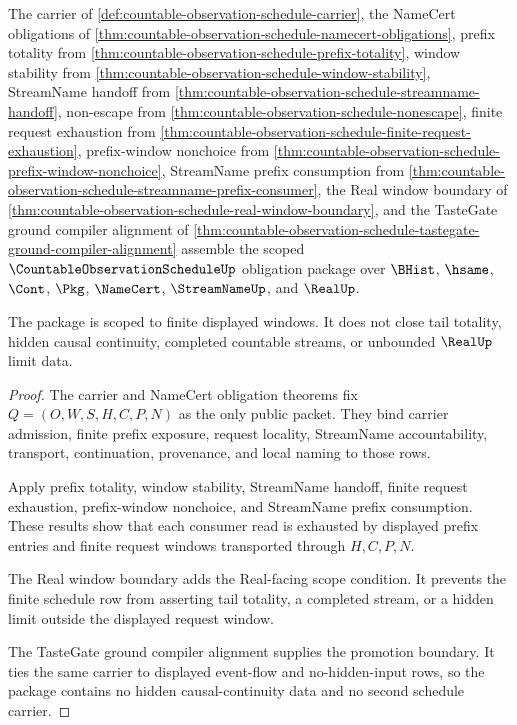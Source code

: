 \begin{theorem}
\label{thm:countable-observation-schedule-scoped-obligation-package}
The carrier of \autoref{def:countable-observation-schedule-carrier}, the NameCert obligations of \autoref{thm:countable-observation-schedule-namecert-obligations}, prefix totality from \autoref{thm:countable-observation-schedule-prefix-totality}, window stability from \autoref{thm:countable-observation-schedule-window-stability}, StreamName handoff from \autoref{thm:countable-observation-schedule-streamname-handoff}, non-escape from \autoref{thm:countable-observation-schedule-nonescape}, finite request exhaustion from \autoref{thm:countable-observation-schedule-finite-request-exhaustion}, prefix-window nonchoice from \autoref{thm:countable-observation-schedule-prefix-window-nonchoice}, StreamName prefix consumption from \autoref{thm:countable-observation-schedule-streamname-prefix-consumer}, the Real window boundary of \autoref{thm:countable-observation-schedule-real-window-boundary}, and the TasteGate ground compiler alignment of \autoref{thm:countable-observation-schedule-tastegate-ground-compiler-alignment} assemble the scoped $\CountableObservationScheduleUp$ obligation package over $\BHist$, $\hsame$, $\Cont$, $\Pkg$, $\NameCert$, $\StreamNameUp$, and $\RealUp$.

The package is scoped to finite displayed windows. It does not close tail totality, hidden causal continuity, completed countable streams, or unbounded $\RealUp$ limit data.
\end{theorem}
\begin{proof}
The carrier and NameCert obligation theorems fix $Q=(O,W,S,H,C,P,N)$ as the only public packet. They bind carrier admission, finite prefix exposure, request locality, StreamName accountability, transport, continuation, provenance, and local naming to those rows.

Apply prefix totality, window stability, StreamName handoff, finite request exhaustion, prefix-window nonchoice, and StreamName prefix consumption. These results show that each consumer read is exhausted by displayed prefix entries and finite request windows transported through $H,C,P,N$.

The Real window boundary adds the Real-facing scope condition. It prevents the finite schedule row from asserting tail totality, a completed stream, or a hidden limit outside the displayed request window.

The TasteGate ground compiler alignment supplies the promotion boundary. It ties the same carrier to displayed event-flow and no-hidden-input rows, so the package contains no hidden causal-continuity data and no second schedule carrier.
\end{proof}

